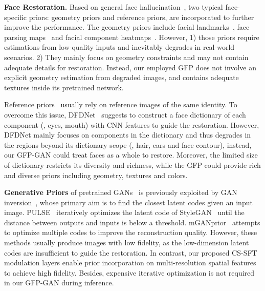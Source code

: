 \documentclass[final]{cvpr}
\begin{document}
\noindent\textbf{Face Restoration.}
Based on general face hallucination~\cite{cao2017attention,huang2017wavelet,xu2017learning,yu2018super}, two typical face-specific priors: geometry priors and reference priors, are incorporated to further improve the performance. 
The geometry priors include facial landmarks~\cite{chen2018fsrnet,kim2019progressive,zhu2016deep}, face parsing maps~\cite{shen2018deep,chen2020psfrgan,chen2018fsrnet} and facial component heatmaps~\cite{yu2018face}.
However, 1) those priors require estimations from low-quality inputs and inevitably degrades in real-world scenarios. 2) They mainly focus on geometry constraints and may not contain adequate details for restoration. Instead, our employed GFP does not involve an explicit geometry estimation from degraded images, and contains adequate textures inside its pretrained network.
 
Reference priors~\cite{li2018GFRNet,li2020enhanced,dogan2019exemplar} usually rely on reference images of the same identity. 
To overcome this issue, DFDNet~\cite{li2020dfdnet} suggests to construct a face dictionary of each component (\eg, eyes, mouth) with CNN features to guide the restoration. 
However, DFDNet mainly focuses on components in the dictionary and thus degrades in the regions beyond its dictionary scope (\eg, hair, ears and face contour), instead, our GFP-GAN could treat faces as a whole to restore. Moreover, the limited size of dictionary restricts its diversity and richness, while the GFP could provide rich and diverse priors including geometry, textures and colors. 


\noindent\textbf{Generative Priors} of pretrained GANs~\cite{karras2018pggan,karras2018stylegan,karras2020stylegan2,brock2018large} is previously exploited by GAN inversion~\cite{abdal2019image2stylegan,zhu2020domain,pan2020dgp,gu2020mGANprior}, whose primary aim is to find the closest latent codes 
given an input image.
PULSE~\cite{menon2020pulse} iteratively optimizes the latent code of StyleGAN~\cite{karras2018stylegan} until the distance between outputs and inputs is below a threshold. mGANprior~\cite{gu2020mGANprior} attempts to optimize multiple codes to improve the reconstruction quality. 
However, these methods usually produce images with low fidelity, as the low-dimension latent codes are insufficient to guide the restoration. In contrast, our proposed CS-SFT modulation layers enable prior incorporation on multi-resolution spatial features to achieve high fidelity. 
Besides, expensive iterative optimization is not required in our GFP-GAN during inference.
\end{document}
